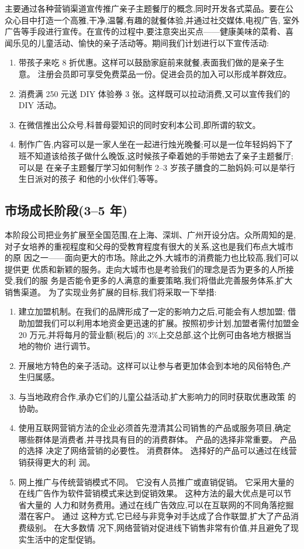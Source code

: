 主要通过各种营销渠道宣传推广亲子主题餐厅的概念,同时开发各式菜品。要在公
众心目中打造一个高雅,干净,温馨,有趣的就餐体验,并通过社交媒体,电视广告,
室外广告等手段进行宣传。在宣传的过程中,要注意突出买点——健康美味的菜肴、喜
闻乐见的儿童活动、愉快的亲子活动等。期间我们计划进行以下宣传活动:
\begin{enumerate}
        \item 带孩子来吃 8 折优惠。这样可以鼓励家庭前来就餐,表面我们做的是亲子生意。
                注册会员即可享受免费菜品一份。促进会员的加入可以形成羊群效应。
        \item 消费满 250 元送 DIY 体验券 3 张。这样既可以拉动消费,又可以宣传我们的 DIY
                活动。
        \item 在微信推出公众号,科普母婴知识的同时安利本公司,即所谓的软文。
        \item 制作广告,内容可以是一家人坐在一起进行烛光晚餐;可以是一位年轻妈妈下了
                班不知道该给孩子做什么晚饭,这时候孩子牵着她的手带她去了亲子主题餐厅;可以是
                在亲子主题餐厅学习如何制作 2--3 岁孩子膳食的二胎妈妈;可以是举行生日派对的孩子
                和他的小伙伴们;等等。
\end{enumerate}

\subsection{市场成长阶段(3--5 年)}
本阶段公司把业务扩展至全国范围,在上海、深圳、广州开设分店。众所周知的是,
对子女培养的重视程度和父母的受教育程度有很大的关系,这也是我们布点大城市的原
因之一——面向更大的市场。除此之外,大城市的消费能力也比较高,我们可以提供更
优质和新颖的服务。走向大城市也是考验我们的理念是否为更多的人所接受,我们的服
务是否能令更多的人满意的重要策略,我们将借此完善服务体系,扩大销售渠道。
为了实现业务扩展的目标,我们将采取一下举措:

\begin{enumerate}[(1)]
\item 建立加盟机制。在我们的品牌形成了一定的影响力之后,可能会有人想加盟;
        借助加盟我们可以利用本地资金更迅速的扩展。按照初步计划,加盟者需付加盟金 20
        万元,并将每月的营业额(税后)的 3\%上交总部,这个比例可由各地方根据当地的物价
        进行调节。
\item 开展地方特色的亲子活动。这样可以让参与者更加体会到本地的风俗特色,产
        生归属感。
\item 与当地政府合作,承办它们的儿童公益活动,扩大影响力的同时获取优惠政策
        的协助。
\item 使用互联网营销方法的企业必须首先澄清其公司销售的产品或服务项目,确定
        哪些群体是消费者,并寻找具有目的的消费群体。 产品的选择非常重要。 产品的选择
        决定了网络营销的必要性。 消费群体。 选择好的产品可以通过在线营销获得更大的利
        润。
\item 网上推广与传统营销模式不同。 它没有人员推广或直销促销。 它采用大量的
        在线广告作为软件营销模式来达到促销效果。 这种方法的最大优点是可以节省大量的
        人力和财务费用。通过在线广告效应,可以在互联网的不同角落挖掘潜在客户。 通过
        这种方式,它已经与非竞争对手达成了合作联盟,扩大了产品消费级别。 在大多数情
        况下,网络营销对促进线下销售非常有价值,并且避免了现实生活中的定型促销。
\end{enumerate}


